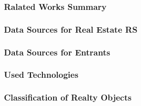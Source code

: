 \documentclass[10pt,dvipsnames]{beamer}
\begin{document}
\begin{frame}
  \frametitle{Ralated Works Summary}
\end{frame}

\begin{frame}
  \frametitle{Data Sources for Real Estate RS}
\end{frame}

\begin{frame}
  \frametitle{Data Sources for Entrants}
\end{frame}

\begin{frame}
  \frametitle{Used Technologies}

\end{frame}

\begin{frame}
  \frametitle{Classification of Realty Objects}


\end{frame}
\end{document}

